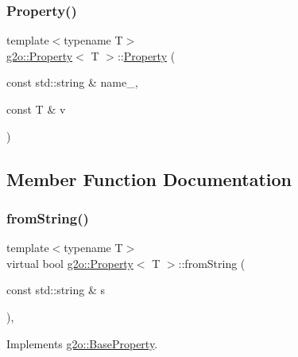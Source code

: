 \mbox{\label{classg2o_1_1_property_a888c7b06876668a0132e32a2a0e28311}} 
\subsubsection{\texorpdfstring{Property()}{Property()}\hspace{0.1cm}{\footnotesize\ttfamily [2/2]}}
{\footnotesize\ttfamily template$<$typename T$>$ \\
\mbox{\hyperlink{classg2o_1_1_property}{g2o\+::\+Property}}$<$ T $>$\+::\mbox{\hyperlink{classg2o_1_1_property}{Property}} (\begin{DoxyParamCaption}\item[{const std\+::string \&}]{name\+\_\+,  }\item[{const T \&}]{v }\end{DoxyParamCaption})\hspace{0.3cm}{\ttfamily [inline]}}



\subsection{Member Function Documentation}
\mbox{\label{classg2o_1_1_property_a5c0a6eacc67e98d4f0b3fd9fe856dbbe}} 
\subsubsection{\texorpdfstring{from\+String()}{fromString()}}
{\footnotesize\ttfamily template$<$typename T$>$ \\
virtual bool \mbox{\hyperlink{classg2o_1_1_property}{g2o\+::\+Property}}$<$ T $>$\+::from\+String (\begin{DoxyParamCaption}\item[{const std\+::string \&}]{s }\end{DoxyParamCaption})\hspace{0.3cm}{\ttfamily [inline]}, {\ttfamily [virtual]}}



Implements \mbox{\hyperlink{classg2o_1_1_base_property_aeabc313d9f66a403738aece884c85e1d}{g2o\+::\+Base\+Property}}.

